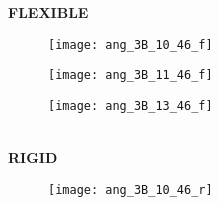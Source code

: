 \documentclass[12pt]{article}
\begin{document}
\begin{figure}[h!]
	\centering
	   \textbf{FLEXIBLE} \\
  \begin{subfigure}[b]{0.15\textwidth}
    \texttt{[image: ang\_3B\_10\_46\_f]}
    \vspace{-15pt} \caption{}
    \label{fig:ang_10_f}
  \end{subfigure}
  \begin{subfigure}[b]{0.15\textwidth}
    \texttt{[image: ang\_3B\_11\_46\_f]}
     \vspace{-15pt} \caption{}
    \label{fig:ang_11_f}
  \end{subfigure}
  \begin{subfigure}[b]{0.15\textwidth}
    \texttt{[image: ang\_3B\_13\_46\_f]}
    \vspace{-15pt} \caption{}
    \label{fig:ang_13_f}
  \end{subfigure} \\     \vspace{-10pt} 
 \textbf{RIGID} \\
  \begin{subfigure}[b]{0.15\textwidth}
    \texttt{[image: ang\_3B\_10\_46\_r]}

\end{subfigure}
\end{figure}
\end{document}
